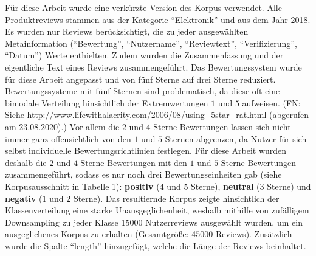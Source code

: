 \documentclass[11pt]{article}
\begin{document}
Für diese Arbeit wurde eine verkürzte Version des Korpus verwendet. Alle
Produktreviews stammen aus der Kategorie ``Elektronik'' und aus dem Jahr
2018. Es wurden nur Reviews berücksichtigt, die zu jeder ausgewählten
Metainformation (``Bewertung'', ``Nutzername'', ``Reviewtext'',
``Verifizierung'', ``Datum'') Werte enthielten. Zudem wurden die
Zusammenfassung und der eigentliche Text eines Reviews zusammengeführt.
Das Bewertungssystem wurde für diese Arbeit angepasst und von fünf
Sterne auf drei Sterne reduziert. Bewertungssysteme mit fünf Sternen
sind problematisch, da diese oft eine bimodale Verteilung hinsichtlich
der Extremwertungen \(1\) und \(5\) aufweisen. (FN: Siehe
http://www.lifewithalacrity.com/2006/08/using\_5star\_rat.html
(abgerufen am 23.08.2020).) Vor allem die \(2\) und \(4\)
Sterne-Bewertungen lassen sich nicht immer ganz offensichtlich von den
\(1\) und \(5\) Sternen abgrenzen, da Nutzer für sich selbst
individuelle Bewertungsrichtlinien festlegen. Für diese Arbeit wurden
deshalb die \(2\) und \(4\) Sterne Bewertungen mit den \(1\) und \(5\)
Sterne Bewertungen zusammengeführt, sodass es nur noch drei
Bewertungseinheiten gab (siehe Korpusausschnitt in Tabelle 1):
\textbf{positiv} (\(4\) und \(5\) Sterne), \textbf{neutral} (\(3\)
Sterne) und \textbf{negativ} (\(1\) und \(2\) Sterne). Das resultiernde
Korpus zeigte hinsichtlich der Klassenverteilung eine starke
Unausgeglichenheit, weshalb mithilfe von zufälligem Downsampling zu
jeder Klasse 15000 Nutzerreviews ausgewählt wurden, um ein
ausgeglichenes Korpus zu erhalten (Gesamtgröße: 45000 Reviews).
Zusätzlich wurde die Spalte ``length'' hinzugefügt, welche die Länge der
Reviews beinhaltet.
\end{document}
